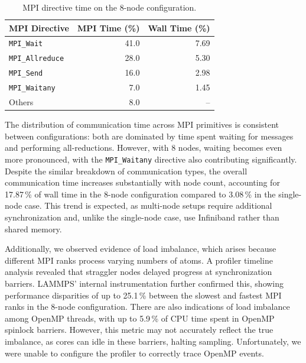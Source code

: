 \documentclass[sigplan, nonacm, screen]{acmart}
\begin{document}
\begin{table}[h]
    \caption{MPI directive time on the $8$-node configuration.}
    \label{mpi-multi-node}

    \begin{tabular}{lrr}
        \toprule
        MPI Directive           & MPI Time (\%) & Wall Time (\%) \\
        \midrule
        \texttt{MPI\_Wait}      &          41.0 &           7.69 \\
        \texttt{MPI\_Allreduce} &          28.0 &           5.30 \\
        \texttt{MPI\_Send}      &          16.0 &           2.98 \\
        \texttt{MPI\_Waitany}   &           7.0 &           1.45 \\
        Others                  &           8.0 &             -- \\
        \bottomrule
    \end{tabular}
\end{table}

The distribution of communication time across MPI primitives is consistent between configurations:
both are dominated by time spent waiting for messages and performing all-reductions. However, with
8 nodes, waiting becomes even more pronounced, with the \texttt{MPI\_Waitany} directive also
contributing significantly. Despite the similar breakdown of communication types, the overall
communication time increases substantially with node count, accounting for 17.87\,\% of wall time in
the 8-node configuration compared to 3.08\,\% in the single-node case. This trend is expected, as
multi-node setups require additional synchronization and, unlike the single-node case, use
Infiniband rather than shared memory.

Additionally, we observed evidence of load imbalance, which arises because different MPI ranks
process varying numbers of atoms. A profiler timeline analysis revealed that straggler nodes delayed
progress at synchronization barriers. LAMMPS' internal instrumentation further confirmed this,
showing performance disparities of up to 25.1\,\% between the slowest and fastest MPI ranks in the
8-node configuration. There are also indications of load imbalance among OpenMP threads, with up to
5.9\,\% of CPU time spent in OpenMP spinlock barriers. However, this metric may not accurately
reflect the true imbalance, as cores can idle in these barriers, halting sampling. Unfortunately, we
were unable to configure the profiler to correctly trace OpenMP events.
\end{document}
